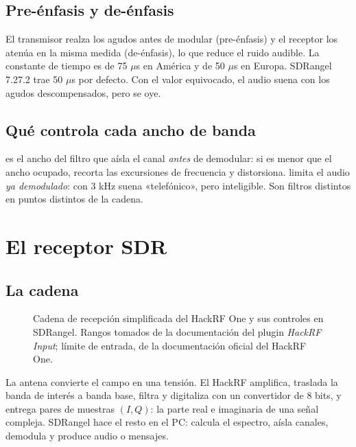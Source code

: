 \subsection{Pre-énfasis y de-énfasis}

El transmisor realza los agudos antes de modular (pre-énfasis) y el receptor los atenúa en la misma medida (de-énfasis), lo que reduce el ruido audible. La constante de tiempo es de 75 $\mu$s en América y de 50 $\mu$s en Europa. SDRangel 7.27.2 trae 50 $\mu$s por defecto. Con el valor equivocado, el audio suena con los agudos descompensados, pero se oye.

\subsection{Qué controla cada ancho de banda}

 es el ancho del filtro que aísla el canal \emph{antes} de demodular: si es menor que el ancho ocupado, recorta las excursiones de frecuencia y distorsiona.  limita el audio \emph{ya demodulado}: con 3 kHz suena «telefónico», pero inteligible. Son filtros distintos en puntos distintos de la cadena.

\section{El receptor SDR}
\label{sec:a-sdr}

\subsection{La cadena}

\begin{figure}[H]
\centering
\resizebox{\linewidth}{!}{}
\caption{Cadena de recepción simplificada del HackRF One y sus controles en SDRangel. Rangos tomados de la documentación del plugin \emph{HackRF Input}; límite de entrada, de la documentación oficial del HackRF One.}
\label{fig:a-frontend}
\end{figure}

La antena convierte el campo en una tensión. El HackRF amplifica, traslada la banda de interés a banda base, filtra y digitaliza con un convertidor de 8 bits, y entrega pares de muestras $(I, Q)$: la parte real e imaginaria de una señal compleja. SDRangel hace el resto en el PC: calcula el espectro, aísla canales, demodula y produce audio o mensajes.

